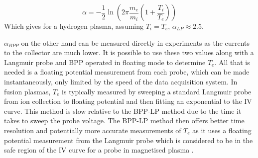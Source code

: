 \begin{equation}
\alpha = - \frac{1}{2} \ln \left(2\pi\frac{m_e}{m_i}\left(1+ \frac{T_i}{T_e}\right)\right)
\label{eq:Stangeby}
\end{equation}
Which gives for a hydrogen plasma, assuming $T_i = T_e$, $\alpha_{LP} \approx 2.5$.



  $\alpha_{BPP}$ on the other hand can be measured directly in experiments as the currents to the collector are much lower. It is possible to use these two values along with a Langmuir probe and BPP operated in floating mode to determine $T_e$. All that is needed is a floating potential measurement from each probe, which can be made instantaneously, only limited by the speed of the data acquisition system. In fusion plasmas, $T_e$ is typically measured by sweeping a standard Langmuir probe from ion collection to floating potential and then fitting an exponential to the IV curve. This method is slow relative to the BPP-LP method due to the time it takes to sweep the probe voltage. The BPP-LP method then offers better time resolution and potentially more accurate measurements of $T_e$ as it uses a floating potential measurement from the Langmuir probe which is considered to be in the safe region of the IV curve for a probe in magnetised plasma \cite{iv_safe_region}. 






